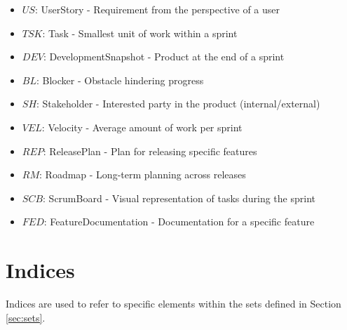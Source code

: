 \documentclass[a4paper, 11pt]{article}
\begin{document}
\begin{itemize}
    \item $US$: UserStory - Requirement from the perspective of a user
    \item $TSK$: Task - Smallest unit of work within a sprint
    \item $DEV$: DevelopmentSnapshot - Product at the end of a sprint
    \item $BL$: Blocker - Obstacle hindering progress
    \item $SH$: Stakeholder - Interested party in the product (internal/external)
    \item $VEL$: Velocity - Average amount of work per sprint
    \item $REP$: ReleasePlan - Plan for releasing specific features
    \item $RM$: Roadmap - Long-term planning across releases
    \item $SCB$: ScrumBoard - Visual representation of tasks during the sprint
    \item $FED$: FeatureDocumentation - Documentation for a specific feature
\end{itemize}

\section{Indices}
\label{sec:indices}
Indices are used to refer to specific elements within the sets defined in Section \ref{sec:sets}.
\end{document}
